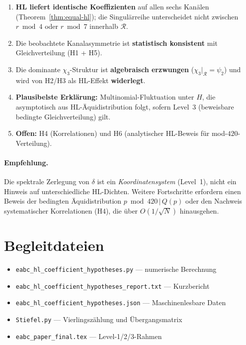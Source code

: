 \documentclass[11pt,a4paper]{article}
\newcommand{\R}{\mathcal{R}}
\begin{document}
\begin{enumerate}
  \item \textbf{HL liefert identische Koeffizienten} auf allen sechs Kanälen
        (Theorem~\ref{thm:equal-hl}); die Singulärreihe unterscheidet
        nicht zwischen $r\bmod 4$ oder $r\bmod 7$ innerhalb $\R$.
  \item Die beobachtete Kanalasymmetrie ist \textbf{statistisch konsistent}
        mit Gleichverteilung (H1 + H5).
  \item Die dominante $\chi_3$-Struktur ist \textbf{algebraisch erzwungen}
        ($\chi_3|_{\R}=\psi_2$) und wird von H2/H3 als HL-Effekt
        \textbf{widerlegt}.
  \item \textbf{Plausibelste Erklärung:} Multinomial-Fluktuation unter $H$,
        die asymptotisch aus HL-Äquidistribution folgt, sofern Level~3
        (beweisbare bedingte Gleichverteilung) gilt.
  \item \textbf{Offen:} H4 (Korrelationen) und H6 (analytischer HL-Beweis
        für mod-$420$-Verteilung).
\end{enumerate}

\paragraph{Empfehlung.}
Die spektrale Zerlegung von $\delta$ ist ein \emph{Koordinatensystem}
(Level~1), nicht ein Hinweis auf unterschiedliche HL-Dichten.
Weitere Fortschritte erfordern einen Beweis der bedingten Äquidistribution
$p\bmod 420\,|\,Q(p)$ oder den Nachweis systematischer Korrelationen
(H4), die über $O(1/\sqrt{N})$ hinausgehen.

\section*{Begleitdateien}

\begin{itemize}
  \item \texttt{eabc\_hl\_coefficient\_hypotheses.py} --- numerische Berechnung
  \item \texttt{eabc\_hl\_coefficient\_hypotheses\_report.txt} --- Kurzbericht
  \item \texttt{eabc\_hl\_coefficient\_hypotheses.json} --- Maschinenlesbare Daten
  \item \texttt{Stiefel.py} --- Vierlingszählung und Übergangsmatrix
  \item \texttt{eabc\_paper\_final.tex} --- Level-1/2/3-Rahmen
\end{itemize}
\end{document}
